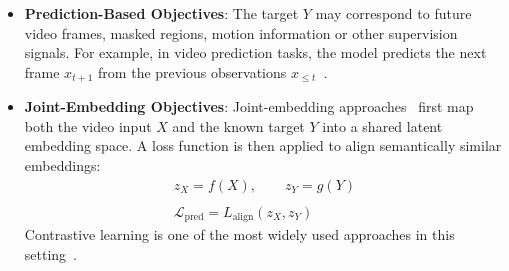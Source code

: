 \begin{itemize}
    \item \textbf{Prediction-Based Objectives}: The target $Y$ may correspond to future video frames, masked regions, motion information or other supervision signals. For example, in video prediction tasks, the model predicts the next frame $x_{t+1}$ from the previous observations $x_{\leq t}$~\cite{Gao2022SimVPSY, Jang2024VisualRL}. 


    \item \textbf{Joint-Embedding Objectives}: Joint-embedding approaches~\cite{Oord2018RepresentationLW, Xian2023TowardsGR, bardes2023v} first map both the video input $X$ and the known target $Y$ into a shared latent embedding space. A loss function is then applied to align semantically similar embeddings: 
    \begin{equation}
        \begin{aligned}
            z_X = f(X),
            \qquad
            z_Y = g(Y) \\
            \\
            \mathcal{L}_{\text{pred}} = L_{\text{align}}(z_X, z_Y)
        \end{aligned}
    \end{equation}
    Contrastive learning is one of the most widely used approaches in this setting~\cite{ChantrySchiappa2022SelfSupervisedLF}. 
\end{itemize}


